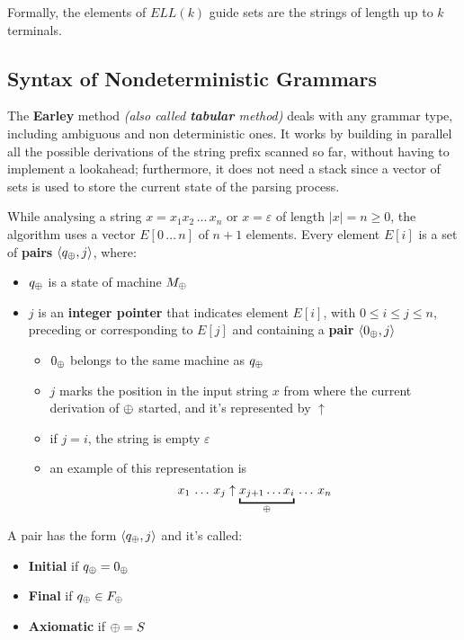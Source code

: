 \documentclass[english]{article}
\begin{document}
Formally, the elements of \(\textit{ELL}(k)\) guide sets are the strings of length up to \(k\) terminals.

\subsection{Syntax  of Nondeterministic Grammars}

The \textbf{Earley} method \textit{(also called \textbf{tabular} method)} deals with any grammar type, including ambiguous and non deterministic ones.
It works by building in parallel all the possible derivations of the string prefix scanned so far, without having to implement a lookahead;
furthermore, it does not need a stack since a vector of sets is used to store the current state of the parsing process.

\bigskip
While analysing a string \(x = x_1 x_2 \,\ldots\, x_n\) or \(x = \varepsilon\) of length \(|x| = n \geq 0\), the algorithm uses a vector \(E\left[ 0 \,\ldots\, n \right]\) of \(n+1\) elements.
Every element \(E[i]\) is a set of \textbf{pairs} \(\langle q_\oplus, j\rangle\), where:

\begin{itemize}
  \item \(q_\oplus\) is a state of machine \(M_\oplus\)
  \item \(j\) is an \textbf{integer pointer} that indicates element \(E[i]\), with \(0 \leq i \leq j \leq n\), preceding or corresponding to \(E[j]\) and containing a \textbf{pair} \(\langle 0_\oplus, j \rangle\)
        \begin{itemize}
          \item \(0_\oplus\) belongs to the same machine as \(q_\oplus\)
          \item \(j\) marks the position in the input string \(x\) from where the current derivation of \(\oplus\) started, and it's represented by \(\uparrow\)
          \item if \(j = i\), the string is empty \(\varepsilon\)
          \item an example of this representation is \[ x_1 \,\ldots\, x_j \uparrow \underbracket{x_{j+1}\ldots x_i}_{\genericchar} \,\ldots\, x_n \]
        \end{itemize}
\end{itemize}

A pair has the form \(\langle q_\oplus, j \rangle\) and it's called:
\begin{itemize}
  \item \textbf{Initial} if \(q_\oplus = 0_\oplus\)
  \item \textbf{Final} if \(q_\oplus \in F_\oplus\)
  \item \textbf{Axiomatic} if \(\oplus = S\)
\end{itemize}
\end{document}
